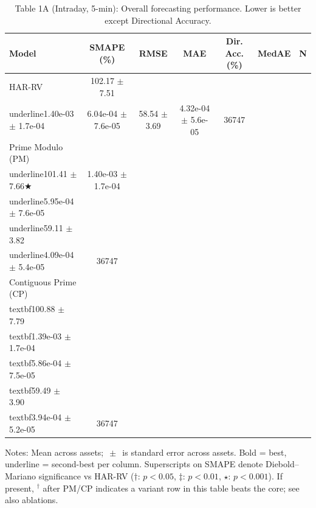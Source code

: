 \begin{table}[t]
\centering
\caption{Table 1A (Intraday, 5-min): Overall forecasting performance. Lower is better except Directional Accuracy.}
\label{tab:overall_intraday}
\begin{tabular}{lcccccc}
\toprule
Model & SMAPE (\%) & RMSE & MAE & Dir. Acc. (\%) & MedAE & N \\
\midrule
HAR-RV & 102.17 $\pm$ 7.51 & \\underline{1.40e-03 $\pm$ 1.7e-04} & 6.04e-04 $\pm$ 7.6e-05 & 58.54 $\pm$ 3.69 & 4.32e-04 $\pm$ 5.6e-05 & 36747 \\
Prime Modulo (PM) & \\underline{101.41 $\pm$ 7.66★} & 1.40e-03 $\pm$ 1.7e-04 & \\underline{5.95e-04 $\pm$ 7.6e-05} & \\underline{59.11 $\pm$ 3.82} & \\underline{4.09e-04 $\pm$ 5.4e-05} & 36747 \\
Contiguous Prime (CP) & \\textbf{100.88 $\pm$ 7.79} & \\textbf{1.39e-03 $\pm$ 1.7e-04} & \\textbf{5.86e-04 $\pm$ 7.5e-05} & \\textbf{59.49 $\pm$ 3.90} & \\textbf{3.94e-04 $\pm$ 5.2e-05} & 36747 \\
\bottomrule
\end{tabular}
\vspace{2pt}\par\footnotesize Notes: Mean across assets; $\,\pm\,$ is standard error across assets. Bold = best, underline = second-best per column. Superscripts on SMAPE denote Diebold--Mariano significance vs HAR-RV ($\dagger$: $p<0.05$, $\ddagger$: $p<0.01$, $\star$: $p<0.001$). If present, $^\dagger$ after PM/CP indicates a variant row in this table beats the core; see also ablations.
\end{table}